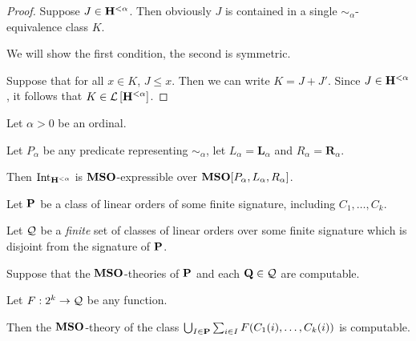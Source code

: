 \begin{proof}
  Suppose $J \in \mathbf{H}^{< \alpha}$.
  Then obviously $J$ is contained in a single $\sim_{\alpha}$-equivalence class $K$.

  We will show the first condition, the second is symmetric.

  Suppose that for all $x \in K$, $J \le x$.
  Then we can write $K = J + J'$.
  Since $J \in \mathbf{H}^{< \alpha}$, it follows that $K \in \mathcal{L} \left[ {\mathbf{H}^{< \alpha}} \right]$.
\end{proof}

\begin{corollary}\label{int-expressible}
  Let $\alpha > 0$ be an ordinal.

  Let $P_{\alpha}$ be any predicate representing $\sim_{\alpha}$,
  let $L_{\alpha} = \mathbf{L}_{\alpha}$ and $R_{\alpha} = \mathbf{R}_{\alpha}$.

  Then $\mathrm{Int}_{\mathbf{H}^{< \alpha}}$ is $\mathbf{MSO}$-expressible over
  $\mathbf{MSO}[P_{\alpha}, L_{\alpha}, R_{\alpha}]$.
\end{corollary}

\begin{theorem}\label{computable-sum}
  Let $\mathbf{P}$ be a class of linear orders of some finite signature,
  including $C_1, \ldots, C_k$.

  Let $\mathcal{Q}$ be a \emph{finite} set of classes of linear orders
  over some finite signature which is disjoint from the signature of $\mathbf{P}$.

  Suppose that the $\mathbf{MSO}$-theories of $\mathbf{P}$ and each $\mathbf{Q} \in \mathcal{Q}$ are computable.

  Let $F : 2^k \to \mathcal{Q}$ be any function.

  Then the $\mathbf{MSO}$-theory of the class $\bigcup_{I \in \mathbf{P}} \sum_{i \in I} F(C_1(i), \ldots, C_k(i))$
  is computable.
\end{theorem}

